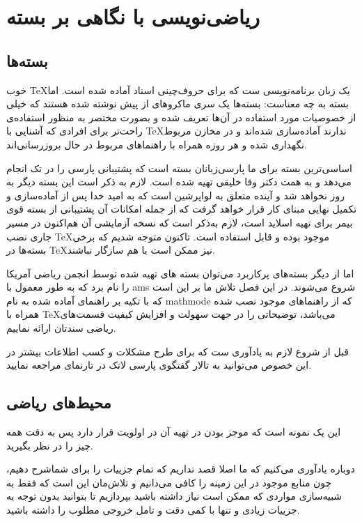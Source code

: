 \chapter[ریاضی‌نویسی با نگاهی بر بسته AMS]{ریاضی‌نویسی با نگاهی بر بسته }
\section{بسته‌ها}
خوب \TeX یک زبان برنامه‌نویسی ست که برای حروف‌چینی اسناد آماده شده است. اما بسته به چه معناست: بسته‌ها یک سری ماکروهای از پیش نوشته شده هستند که خیلی از خصوصیات مورد استفاده در آن‌ها تعریف شده و بصورت
 مختصر به منظور استفاده‌ی راحت‌تر برای افرادی که آشنایی با \TeX ندارند آماده‌سازی شده‌اند و در مخازن مربوط نگهداری شده و هر روزه همراه با راهنماهای مربوط در حال بروزرسانی‌اند.

اساسی‌ترین بسته برای ما پارسی‌زبانان بسته
\XePersian
است که پشتیبانی پارسی را در تک انجام می‌دهد و به همت دکتر وفا خلیقی تهیه شده است. لازم به ذکر است این بسته دیگر به روز نخواهد شد و آینده متعلق به لواپرشین است که به امید خدا پس از آماده‌سازی و تکمیل نهایی مبنای کار قرار خواهد گرفت که از جمله امکانات آن پشتیبانی از بسته قوی بیمر برای تهیه اسلاید است، لازم به‌ذکر است که نسخه آزمایشی آن هم‌اکنون در مسیر جاری نصب \TeX موجود بوده و قابل استفاده است. تاکنون متوجه شدیم که برخی بسته‌ها در \TeX نیز ممکن است با هم سازگار نباشند.

اما از دیگر بسته‌های پرکاربرد می‌توان بسته های تهیه شده توسط انجمن ریاضی آمریکا را نام برد که به طور معمول با ams شروع می‌شوند. در این فصل تلاش ما بر این است که با تکیه بر راهنمای آماده شده به نام mathmode که از راهنماهای موجود نصب شده همراه با \TeX می‌باشد، توضیحاتی را در جهت سهولت و افزایش کیفیت قسمت‌های ریاضی سندتان ارائه نماییم.

قبل از شروع لازم به یادآوری‌ ست که برای طرح مشکلات و کسب اطلاعات بیشتر در این خصوص می‌توانید به تالار گفتگوی پارسی لاتک در تارنمای   مراجعه نمایید.

\section{محیط‌های ریاضی}
این یک نمونه است که موجز بودن در تهیه آن در اولویت قرار دارد پس به دقت همه چیز را در نظر بگیرید.

دوباره یادآوری می‌کنیم که ما اصلا قصد نداریم که تمام جزییات را برای‌ شماشرح دهیم، چون منابع موجود در این زمینه را کافی می‌دانیم و تلاش‌مان این است که فقط به شبیه‌سازی مواردی که ممکن است نیاز داشته باشید بپردازیم تا بتوانید بدون توجه به جزییات زیادی و تنها با کمی دقت و تامل خروجی مطلوب را داشته باشید.

